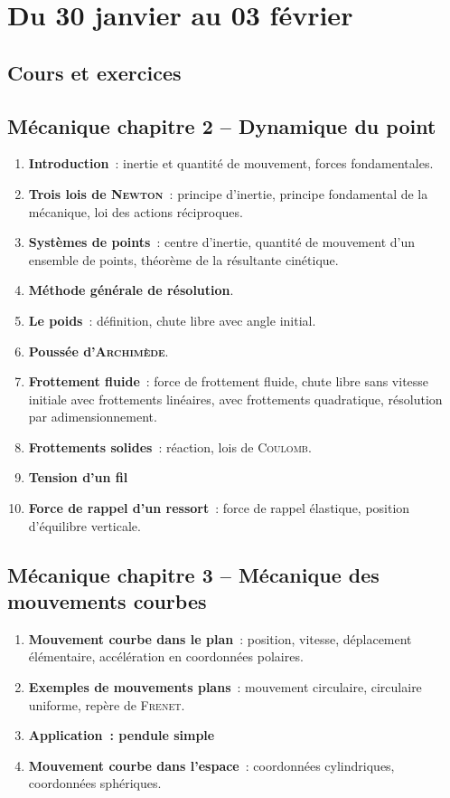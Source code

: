 \documentclass[a4paper, 12pt, final, garamond]{book}
\begin{document}
\setcounter{chapter}{16}

\chapter{Du 30 janvier au 03 f\'evrier}

\section{Cours et exercices}
\section*{Mécanique chapitre 2 -- Dynamique du point}
\begin{enumerate}[label=\Roman*]
    \item \textbf{Introduction}~: inertie et quantité de mouvement, forces
        fondamentales.
    \item \textbf{Trois lois de \textsc{Newton}}~: principe d'inertie, principe
        fondamental de la mécanique, loi des actions réciproques.
    \item \textbf{Systèmes de points}~: centre d'inertie, quantité de mouvement
        d'un ensemble de points, théorème de la résultante cinétique.
    \item \textbf{Méthode générale de résolution}.
    \item \textbf{Le poids}~: définition, chute libre avec angle initial.
    \item \textbf{Poussée d'\textsc{Archimède}}.
    \item \textbf{Frottement fluide}~: force de frottement fluide, chute libre
        sans vitesse initiale avec frottements linéaires, avec frottements
        quadratique, résolution par adimensionnement.
    \item \textbf{Frottements solides}~: réaction, lois de \textsc{Coulomb}.
    \item \textbf{Tension d'un fil}
    \item \textbf{Force de rappel d'un ressort}~: force de rappel élastique,
        position d'équilibre verticale.
\end{enumerate}

\section*{Mécanique chapitre 3 -- Mécanique des mouvements courbes}
\begin{enumerate}[label=\Roman*]
    \item \textbf{Mouvement courbe dans le plan}~: position, vitesse,
        déplacement élémentaire, accélération en coordonnées polaires.
    \item \textbf{Exemples de mouvements plans}~: mouvement circulaire,
        circulaire uniforme, repère de \textsc{Frenet}.
    \item \textbf{Application~: pendule simple}
    \item \textbf{Mouvement courbe dans l'espace}~: coordonnées cylindriques,
        coordonnées sphériques.
\end{enumerate}
\end{document}
